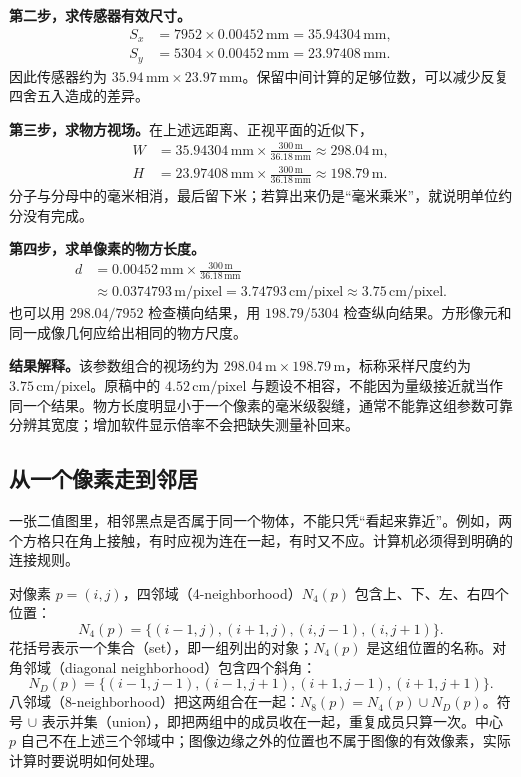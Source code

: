 \textbf{第二步，求传感器有效尺寸。}
\begin{align*}
 S_x&=7952\times0.00452\,\mathrm{mm}=35.94304\,\mathrm{mm},\\
 S_y&=5304\times0.00452\,\mathrm{mm}=23.97408\,\mathrm{mm}.
\end{align*}
因此传感器约为 $35.94\,\mathrm{mm}\times23.97\,\mathrm{mm}$。保留中间计算的足够位数，可以减少反复四舍五入造成的差异。

\textbf{第三步，求物方视场。}在上述远距离、正视平面的近似下，
\begin{align*}
 W&=35.94304\,\mathrm{mm}\times
       \frac{300\,\mathrm{m}}{36.18\,\mathrm{mm}}
   \approx298.04\,\mathrm{m},\\
 H&=23.97408\,\mathrm{mm}\times
       \frac{300\,\mathrm{m}}{36.18\,\mathrm{mm}}
   \approx198.79\,\mathrm{m}.
\end{align*}
分子与分母中的毫米相消，最后留下米；若算出来仍是“毫米乘米”，就说明单位约分没有完成。

\textbf{第四步，求单像素的物方长度。}
\begin{align*}
 d&=0.00452\,\mathrm{mm}\times
       \frac{300\,\mathrm{m}}{36.18\,\mathrm{mm}}\\
  &\approx0.0374793\,\mathrm{m/pixel}
   =3.74793\,\mathrm{cm/pixel}
   \approx3.75\,\mathrm{cm/pixel}.
\end{align*}
也可以用 $298.04/7952$ 检查横向结果，用 $198.79/5304$ 检查纵向结果。方形像元和同一成像几何应给出相同的物方尺度。

\textbf{结果解释。}该参数组合的视场约为 $298.04\,\mathrm{m}\times198.79\,\mathrm{m}$，标称采样尺度约为 $3.75\,\mathrm{cm/pixel}$。原稿中的 $4.52\,\mathrm{cm/pixel}$ 与题设不相容，不能因为量级接近就当作同一个结果。物方长度明显小于一个像素的毫米级裂缝，通常不能靠这组参数可靠分辨其宽度；增加软件显示倍率不会把缺失测量补回来。

\subsection{从一个像素走到邻居}

一张二值图里，相邻黑点是否属于同一个物体，不能只凭“看起来靠近”。例如，两个方格只在角上接触，有时应视为连在一起，有时又不应。计算机必须得到明确的连接规则。

对像素 $p=(i,j)$，四邻域（4-neighborhood）$N_4(p)$ 包含上、下、左、右四个位置：
\[
 N_4(p)=\{(i-1,j),(i+1,j),(i,j-1),(i,j+1)\}.
\]
花括号表示一个集合（set），即一组列出的对象；$N_4(p)$ 是这组位置的名称。对角邻域（diagonal neighborhood）包含四个斜角：
\[
 N_D(p)=\{(i-1,j-1),(i-1,j+1),(i+1,j-1),(i+1,j+1)\}.
\]
八邻域（8-neighborhood）把这两组合在一起：$N_8(p)=N_4(p)\cup N_D(p)$。符号 $\cup$ 表示并集（union），即把两组中的成员收在一起，重复成员只算一次。中心 $p$ 自己不在上述三个邻域中；图像边缘之外的位置也不属于图像的有效像素，实际计算时要说明如何处理。

